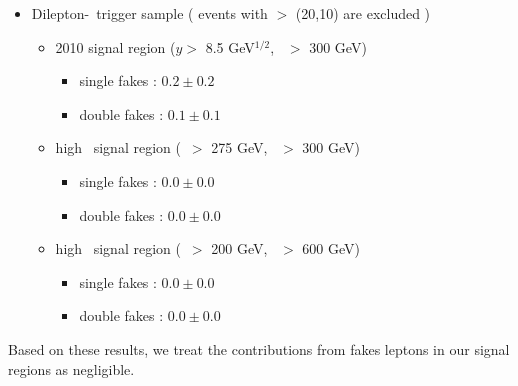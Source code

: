 \begin{itemize}
\item Dilepton-\Ht\ trigger sample ( events with \pt $>$ (20,10) are excluded )
\begin{itemize}
\item 2010 signal region ($y >$ 8.5 GeV$^{1/2}$, \Ht\ $>$ 300 GeV)
   \begin{itemize} 
   \item single fakes : $0.2 \pm 0.2$
   \item double fakes : $0.1 \pm 0.1$
   \end{itemize}  
\item high \met\ signal region (\met\ $>$ 275 GeV, \Ht\ $>$ 300 GeV)
   \begin{itemize} 
   \item single fakes : $0.0 \pm 0.0$
   \item double fakes : $0.0 \pm 0.0$
   \end{itemize}  
\item high \Ht\ signal region (\met\ $>$ 200 GeV, \Ht\ $>$ 600 GeV)
   \begin{itemize} 
   \item single fakes : $0.0 \pm 0.0$
   \item double fakes : $0.0 \pm 0.0$
   \end{itemize}  
\end{itemize}
\end{itemize}

Based on these results, we treat the contributions from fakes leptons in our signal
regions as negligible.

